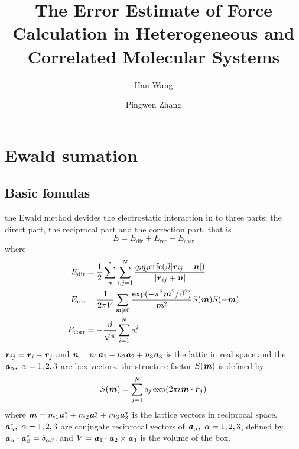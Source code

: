 \documentclass[aps,pre,preprint]{revtex4}
\renewcommand{\v}[1]{\textbf{\textit{#1}}}
\begin{document}
\title{The Error Estimate of Force Calculation in Heterogeneous and Correlated Molecular Systems}
\author{Han Wang}
\author{Pingwen Zhang}

\begin{abstract}
\end{abstract}

\maketitle


\section{Ewald sumation}
\subsection{Basic fomulas}
the Ewald method devides the electrostatic interaction in to three
parts: the direct part, the reciprocal part and the correction
part. that is
\begin{equation}
E = E_{\textrm{dir}} + E_{\textrm{rec}} + E_{\textrm{corr}}
\end{equation}
where 
\begin {align}
E_{\textrm{dir}} & = \frac12 \sum^{\ast}_{\v n}
\sum_{i,j = 1}^{N} \frac{q_iq_j \textrm{erfc}(\beta \vert\v{r}_{ij} + \v{n}\vert)}
{\vert\v{r}_{ij} + \v{n}\vert} \\
E_{\textrm{rec}} & = \frac1{2\pi V} \sum_{\v m \neq 0}
\frac{\exp(-\pi^2\v m^2 / \beta^2)}{\v m^2} S(\v m) S(-\v m) \\
 E_{\textrm{corr}}& = -\frac\beta{\sqrt \pi} \sum_{i=1}^N q_i^2
\end {align}
$\v r_{ij} = \v r_i - \v r_j$ and $\v n = n_1 \v a_1 + n_2 \v a_2 +
n_3 \v a_3$ is the lattic in real space and the $\v a_\alpha, \
\alpha=1,2,3$ are box vectors. the structure factor $S(\v m)$ is
defined by
\begin{equation}\label{sm1}
S(\v m) = \sum_{j=1}^N q_j \exp (2 \pi i \v m \cdot \v r_j)
\end{equation}
where $\v m = m_1 \v a_1^\ast + m_2 \v a_2^\ast + m_3 \v a_3^\ast$ is
the lattice vectors in reciprocal space. $\v a_\alpha^\ast,\ \alpha =
1, 2, 3$ are conjugate reciprocal vectors of $\v a_\alpha,\ \alpha =
1, 2, 3$, defined by $\v a_\alpha \cdot \v a_\beta^\ast =
\delta_{\alpha\beta}$. and $V = \v a_1 \cdot \v a_2 \times \v a_3$ is
the volume of the box.
\end{document}
